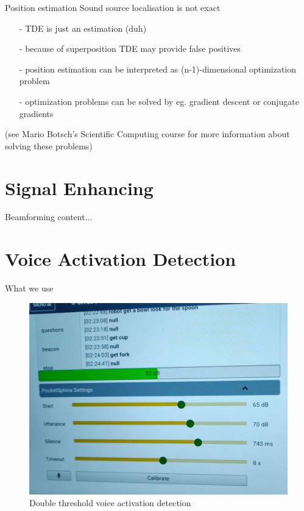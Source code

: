 \documentclass{beamer}
\begin{document}
	\begin{frame}{Position estimation}
		Sound source localisation is not exact
		\begin{itemize}
			\item[-] TDE is just an estimation (duh)
			\item[-] because of superposition TDE may provide false positives
			\item[-] position estimation can be interpreted as (n-1)-dimensional optimization problem
			\item[-] optimization problems can be solved by eg. gradient descent or conjugate gradients
		\end{itemize}
		(see Mario Botsch's Scientific Computing course for more information about solving these problems)
	\end{frame}
	
	\section{Signal Enhancing}%
	
	\begin{frame}{Beamforming}
		content...
	\end{frame}
	
	\section{Voice Activation Detection}%
	
	\begin{frame}{What we use}
		\begin{figure}[ht]
			\centering
			\includegraphics[width=.8\linewidth]{Bilder/VAD.jpg}
			\caption{Double threshold voice activation detection}
		\end{figure}
	\end{frame}
	
\end{document}
